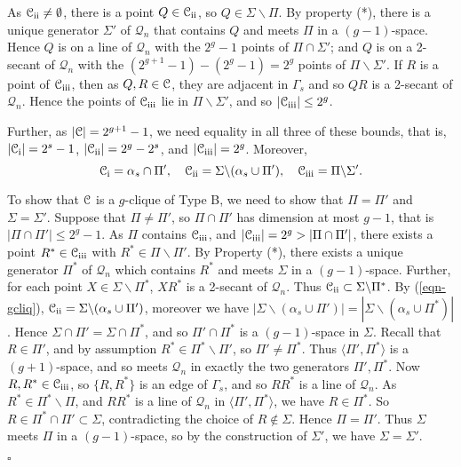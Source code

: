 \documentclass[12pt]{article}
\newenvironment{proof}{\noindent{\bf Proof}\hspace{0.5em}}
    { \null  \hfill $\square$ \par}
\newcommand\C{{\cal C}}
\newcommand{\Q}{\mathscr Q}
\renewcommand\setminus{\backslash}
\newcommand{\setX}{{\mathcal C}_{{\rm\romannumeral 1}}}
\newcommand{\setY}{{\mathcal C}_{{\rm\romannumeral 2}}}
\newcommand{\setZ}{{\mathcal C}_{{\rm\romannumeral 3}}}
\begin{document}
\begin{proof}
{As $\setY\neq\emptyset$, there is a point   $Q\in\setY$,  so $Q\in\Sigma\setminus\Pi$. 
 By property (*),  there is a unique generator $\Sigma'$ of $\Q_n$ that contains $Q$ and meets $\Pi$ in a $(g-1)$-space. Hence $Q$ is on a line of $\Q_n$ with the $2^g-1$ points of $\Pi\cap\Sigma'$; and  $Q$ is on a 2-secant of $\Q_n$ with the $(2^{g+1}-1)-(2^g-1)=2^g$ points of $\Pi\setminus\Sigma'$. 
If $R$ is a point of $\setZ$, then as $Q,R\in\C$, they are adjacent in $\Gamma_s$ and so $QR$ is a 2-secant of $\Q_n$. Hence the points of $\setZ$ lie in $\Pi\setminus\Sigma'$, and so
 $|\setZ|\leq2^g$. 
 
  
Further, as $|\C|=2^{g+1}-1$, we need equality in all three of these  bounds, that is,
$|\setX|=2^s-1$,   
$|\setY|=2^g-2^s$,
and $|\setZ|=2^g$.
Moreover,  \begin{equation}\label{eqn-gcliq} \setX=\alpha_s\cap\Pi',\quad
\setY=\Sigma\setminus(\alpha_s\cup\Pi'), \quad
\setZ=\Pi\setminus\Sigma'.\end{equation}


To show that $\C$ is a $g$-clique of Type B, we need to show that $\Pi=\Pi'$ and $\Sigma=\Sigma'$. 
Suppose that $\Pi\ne\Pi'$, so $\Pi\cap\Pi'$ has dimension at most $g-1$, that is $|\Pi\cap\Pi'|\leq 2^g-1$. As $\Pi$ contains $\setZ$,  and $|\setZ|=2^g>|\Pi\cap\Pi'|$, 
there exists a point $R^*\in\setZ$ with $R^*\in\Pi\backslash\Pi'$.  By Property (*), there exists a unique generator $\Pi^*$ of $\Q_n$ which contains $R^*$ and meets $\Sigma$ in a $(g-1)$-space. 
Further, for each point $X\in\Sigma\setminus\Pi^*$, $XR^*$ is a 2-secant of $\Q_n$. Thus $\setY\subset\Sigma\setminus\Pi^*$. By (\ref{eqn-gcliq}), $\setY=\Sigma\setminus(\alpha_s\cup\Pi')$, moreover we have $|\Sigma\setminus(\alpha_s\cup\Pi')|=|\Sigma\setminus(\alpha_s\cup\Pi^*)|$. Hence $\Sigma\cap\Pi'=\Sigma\cap\Pi^*$, and so $\Pi'\cap\Pi^*$ is a $(g-1)$-space  in $\Sigma$. Recall that $R\in\Pi'$, and by assumption $R^*\in\Pi^*\setminus\Pi'$, so $\Pi'\neq\Pi^*$. Thus $\langle\Pi',\Pi^*\rangle$ is a $(g+1)$-space, and so meets $\Q_n$ in exactly the two generators $\Pi',\Pi^*$. Now $R,R^*\in\setZ$, so $\{R,R^*\}$ is an edge of $\Gamma_s$, and so $RR^*$ is a line of $\Q_n$. As $R^*\in\Pi^*\setminus\Pi$, and $RR^*$ is a line of $\Q_n$ in $\langle\Pi',\Pi^*\rangle$, we have $R\in\Pi^*$. So $R\in\Pi^*\cap\Pi'\subset\Sigma$, contradicting the choice of $R\not\in\Sigma$.
 Hence 
 $\Pi=\Pi'$. Thus $\Sigma$ meets $\Pi$ in a $(g-1)$-space, so by the construction of $\Sigma'$, we have $\Sigma=\Sigma'$.


}


\end{proof}
\end{document}
